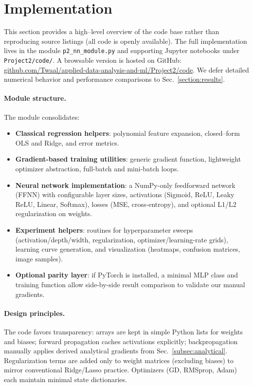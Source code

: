 \documentclass[amssymb,twocolumn,aps]{revtex4}
\begin{document}
\section{Implementation}
This section provides a high–level overview of the code base rather than reproducing source listings (all code is openly available). The full implementation lives in the module \texttt{p2\_nn\_module.py} and supporting Jupyter notebooks under \texttt{Project2/code/}. A browsable version is hosted on GitHub: \href{https://github.com/Twaal/applied-data-analysis-and-ml/tree/main/Project2/code}{github.com/Twaal/applied-data-analysis-and-ml/Project2/code}. We defer detailed numerical behavior and performance comparisons to Sec.~\ref{section:results}.

\paragraph{Module structure.} The module consolidates:
\begin{itemize}
  \item \textbf{Classical regression helpers}: polynomial feature expansion, closed–form OLS and Ridge, and error metrics.
  \item \textbf{Gradient-based training utilities}: generic gradient function, lightweight optimizer abstraction, full-batch and mini-batch loops.
  \item \textbf{Neural network implementation}: a NumPy-only feedforward network (FFNN) with configurable layer sizes, activations (Sigmoid, ReLU, Leaky ReLU, Linear, Softmax), losses (MSE, cross-entropy), and optional L1/L2 regularization on weights.
  \item \textbf{Experiment helpers}: routines for hyperparameter sweeps (activation/depth/width, regularization, optimizer/learning-rate grids), learning curve generation, and visualization (heatmaps, confusion matrices, image samples).
  \item \textbf{Optional parity layer}: if PyTorch is installed, a minimal MLP class and training function allow side-by-side result comparison to validate our manual gradients.
\end{itemize}

\paragraph{Design principles.} The code favors transparency: arrays are kept in simple Python lists for weights and biases; forward propagation caches activations explicitly; backpropagation manually applies derived analytical gradients from Sec.~\ref{subsec:analytical}. Regularization terms are added only to weight matrices (excluding biases) to mirror conventional Ridge/Lasso practice. Optimizers (GD, RMSprop, Adam) each maintain minimal state dictionaries.
\end{document}
